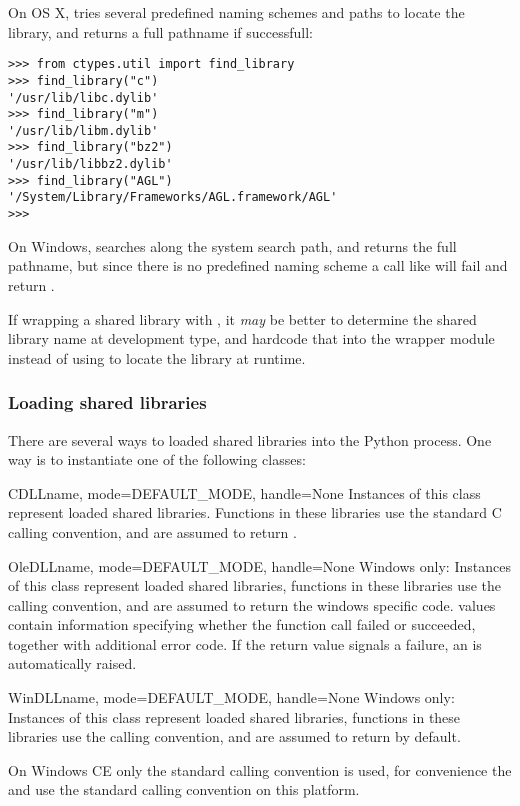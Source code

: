 On OS X,  tries several predefined naming schemes and
paths to locate the library, and returns a full pathname if successfull:
\begin{verbatim}
>>> from ctypes.util import find_library
>>> find_library("c")
'/usr/lib/libc.dylib'
>>> find_library("m")
'/usr/lib/libm.dylib'
>>> find_library("bz2")
'/usr/lib/libbz2.dylib'
>>> find_library("AGL")
'/System/Library/Frameworks/AGL.framework/AGL'
>>>
\end{verbatim}

On Windows,  searches along the system search path,
and returns the full pathname, but since there is no predefined naming
scheme a call like  will fail and return
.

If wrapping a shared library with , it \emph{may} be better to
determine the shared library name at development type, and hardcode
that into the wrapper module instead of using  to
locate the library at runtime.


\subsubsection{Loading shared libraries\label{ctypes-loading-shared-libraries}}

There are several ways to loaded shared libraries into the Python
process.  One way is to instantiate one of the following classes:

\begin{classdesc}{CDLL}{name, mode=DEFAULT_MODE, handle=None}
Instances of this class represent loaded shared libraries.
Functions in these libraries use the standard C calling
convention, and are assumed to return .
\end{classdesc}

\begin{classdesc}{OleDLL}{name, mode=DEFAULT_MODE, handle=None}
Windows only: Instances of this class represent loaded shared
libraries, functions in these libraries use the 
calling convention, and are assumed to return the windows specific
 code.   values contain information
specifying whether the function call failed or succeeded, together
with additional error code.  If the return value signals a
failure, an  is automatically raised.
\end{classdesc}

\begin{classdesc}{WinDLL}{name, mode=DEFAULT_MODE, handle=None}
Windows only: Instances of this class represent loaded shared
libraries, functions in these libraries use the 
calling convention, and are assumed to return  by default.

On Windows CE only the standard calling convention is used, for
convenience the  and  use the standard calling
convention on this platform.
\end{classdesc}

